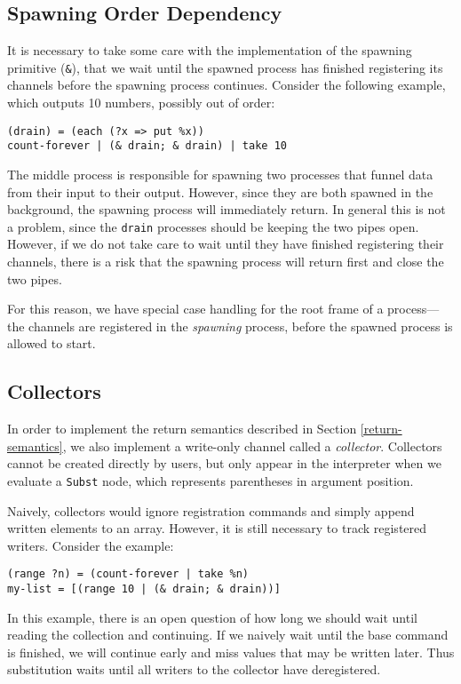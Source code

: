 \documentclass[english,PRO]{ipsj}
\begin{document}
\subsection{Spawning Order Dependency}\noindent
It is necessary to take some care with the implementation of the spawning primitive (\verb/&/), that we wait until the spawned process has finished registering its channels before the spawning process continues. Consider the following example, which outputs 10 numbers, possibly out of order:
\begin{lstlisting}
(drain) = (each (?x => put %x))
count-forever | (& drain; & drain) | take 10
\end{lstlisting}
\noindent
The middle process is responsible for spawning two processes that funnel data from their input to their output. However, since they are both spawned in the background, the spawning process will immediately return. In general this is not a problem, since the \verb/drain/ processes should be keeping the two pipes open. However, if we do not take care to wait until they have finished registering their channels, there is a risk that the spawning process will return first and close the two pipes.

For this reason, we have special case handling for the root frame of a process---the channels are registered in the \emph{spawning} process, before the spawned process is allowed to start.

\subsection{Collectors}\noindent
In order to implement the return semantics described in Section \ref{return-semantics}, we also implement a write-only channel called a \emph{collector}. Collectors cannot be created directly by users, but only appear in the interpreter when we evaluate a \verb/Subst/ node, which represents parentheses in argument position.

Naively, collectors would ignore registration commands and simply append written elements to an array. However, it is still necessary to track registered writers. Consider the example:
\begin{lstlisting}
(range ?n) = (count-forever | take %n)
my-list = [(range 10 | (& drain; & drain))]
\end{lstlisting}

\noindent
In this example, there is an open question of how long we should wait until reading the collection and continuing. If we naively wait until the base command is finished, we will continue early and miss values that may be written later. Thus substitution waits until all writers to the collector have deregistered.
\end{document}
